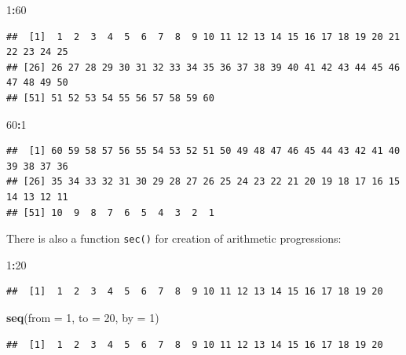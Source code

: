 \documentclass[
]{book}
\newenvironment{Shaded}{\begin{snugshade}}{\end{snugshade}}
\newcommand{\DataTypeTok}[1]{\textcolor[rgb]{0.13,0.29,0.53}{#1}}
\newcommand{\DecValTok}[1]{\textcolor[rgb]{0.00,0.00,0.81}{#1}}
\newcommand{\KeywordTok}[1]{\textcolor[rgb]{0.13,0.29,0.53}{\textbf{#1}}}
\newcommand{\NormalTok}[1]{#1}
\newcommand{\OperatorTok}[1]{\textcolor[rgb]{0.81,0.36,0.00}{\textbf{#1}}}
\begin{document}
\begin{Shaded}
\begin{Highlighting}[]
\DecValTok{1}\OperatorTok{:}\DecValTok{60}
\end{Highlighting}
\end{Shaded}

\begin{verbatim}
##  [1]  1  2  3  4  5  6  7  8  9 10 11 12 13 14 15 16 17 18 19 20 21 22 23 24 25
## [26] 26 27 28 29 30 31 32 33 34 35 36 37 38 39 40 41 42 43 44 45 46 47 48 49 50
## [51] 51 52 53 54 55 56 57 58 59 60
\end{verbatim}

\begin{Shaded}
\begin{Highlighting}[]
\DecValTok{60}\OperatorTok{:}\DecValTok{1}
\end{Highlighting}
\end{Shaded}

\begin{verbatim}
##  [1] 60 59 58 57 56 55 54 53 52 51 50 49 48 47 46 45 44 43 42 41 40 39 38 37 36
## [26] 35 34 33 32 31 30 29 28 27 26 25 24 23 22 21 20 19 18 17 16 15 14 13 12 11
## [51] 10  9  8  7  6  5  4  3  2  1
\end{verbatim}

There is also a function \texttt{sec()} for creation of arithmetic progressions:

\begin{Shaded}
\begin{Highlighting}[]
\DecValTok{1}\OperatorTok{:}\DecValTok{20}
\end{Highlighting}
\end{Shaded}

\begin{verbatim}
##  [1]  1  2  3  4  5  6  7  8  9 10 11 12 13 14 15 16 17 18 19 20
\end{verbatim}

\begin{Shaded}
\begin{Highlighting}[]
\KeywordTok{seq}\NormalTok{(}\DataTypeTok{from =} \DecValTok{1}\NormalTok{, }\DataTypeTok{to =} \DecValTok{20}\NormalTok{, }\DataTypeTok{by =} \DecValTok{1}\NormalTok{)}
\end{Highlighting}
\end{Shaded}

\begin{verbatim}
##  [1]  1  2  3  4  5  6  7  8  9 10 11 12 13 14 15 16 17 18 19 20
\end{verbatim}
\end{document}
